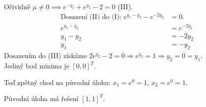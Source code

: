\endgroup
Očividně $\mu \not= 0 \implies e^{-y_1} + e^{y_2} - 2 = 0$ (III).
\begin{align*}
    \text{Dosazení (II) do (I): } e^{y_1 - y_2} - e^{-2y_2} &= 0. \\
    e^{y_1 - y_2} &= e^{-2y_2} \\
    y_1 - y_2 &= -2y_2 \\
    y_1 &= -y_2
\end{align*}
Dosazením do (III) získáme $2e^{y_2} - 2 = 0 \Rightarrow e^{y_2} = 1 \Rightarrow y_2 = 0 = y_1$.\\
Jediný bod minima je $[0,0]^T$.

Teď zpětný chod na původní úlohu: $x_1 = e^0 = 1$, $x_2 = e^0 = 1$. 

Původní úloha má řešení $[1, 1]^T$.

